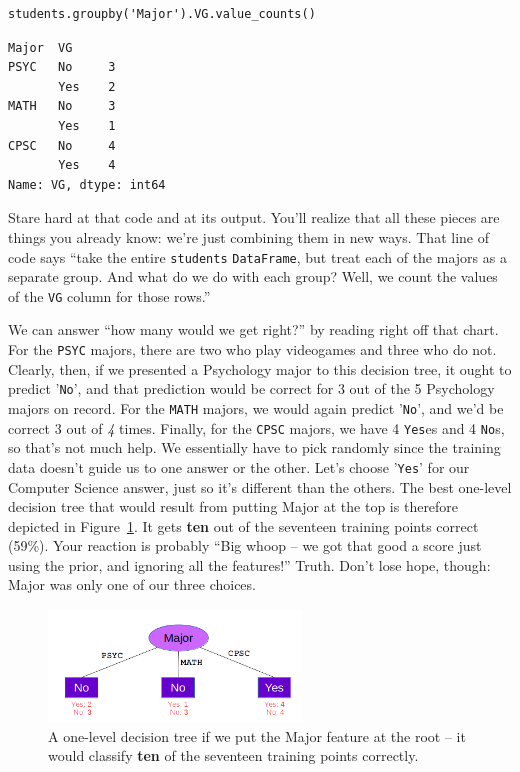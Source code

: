 \begin{Verbatim}[fontsize=\small,samepage=true,frame=single,framesep=3mm]
students.groupby('Major').VG.value_counts()
\end{Verbatim}
\vspace{-.2in}

\begin{Verbatim}[fontsize=\small,samepage=true,frame=leftline,framesep=5mm,framerule=1mm]
Major  VG 
PSYC   No     3
       Yes    2
MATH   No     3
       Yes    1
CPSC   No     4
       Yes    4
Name: VG, dtype: int64
\end{Verbatim}

Stare hard at that code and at its output. You'll realize that all these pieces
are things you already know: we're just combining them in new ways. That line
of code says ``take the entire \texttt{students} \texttt{DataFrame}, but treat
each of the majors as a separate group. And what do we do with each group?
Well, we count the values of the \texttt{VG} column for those rows.''

We can answer ``how many would we get right?'' by reading right off that chart.
For the \texttt{PSYC} majors, there are two who play videogames and three who
do not. Clearly, then, if we presented a Psychology major to this decision
tree, it ought to predict '\texttt{No}', and that prediction would be correct
for 3 out of the 5 Psychology majors on record. For the \texttt{MATH} majors,
we would again predict '\texttt{No}', and we'd be correct 3 out of \textit{4}
times. Finally, for the \texttt{CPSC} majors, we have 4 \texttt{Yes}es and 4
\texttt{No}s, so that's not much help. We essentially have to pick randomly
since the training data doesn't guide us to one answer or the other. Let's
choose '\texttt{Yes}' for our Computer Science answer, just so it's different
than the others. The best one-level decision tree that would result from
putting \textsf{Major} at the top is therefore depicted in
Figure~\ref{fig:majorOnTop}. It gets \textbf{ten} out of the seventeen training
points correct (59\%). Your reaction is probably ``Big whoop -- we got that
good a score just using the prior, and ignoring all the features!'' Truth.
Don't lose hope, though: \textsf{Major} was only one of our three choices.

\begin{figure}[ht]
\centering
\includegraphics[width=0.6\textwidth]{majorOnTop.png}
\caption{A one-level decision tree if we put the \textsf{Major} feature at the
root -- it would classify \textbf{ten} of the seventeen training points
correctly.}
\label{fig:majorOnTop}
\end{figure}

